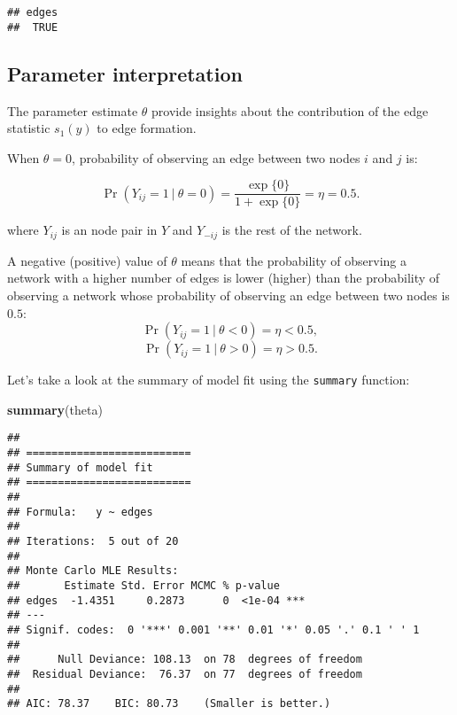 \documentclass[]{book}
\newenvironment{Shaded}{\begin{snugshade}}{\end{snugshade}}
\newcommand{\KeywordTok}[1]{\textcolor[rgb]{0.13,0.29,0.53}{\textbf{{#1}}}}
\newcommand{\NormalTok}[1]{{#1}}
\begin{document}
\begin{verbatim}
## edges 
##  TRUE
\end{verbatim}

\subsection{Parameter interpretation}\label{parameter-interpretation}

The parameter estimate \(\theta\) provide insights about the
contribution of the edge statistic \(s_1(y)\) to edge formation.

When \(\theta = 0\), probability of observing an edge between two nodes
\(i\) and \(j\) is:

\begin{equation*}
\Pr(Y_{ij} = 1\ |\ \theta = 0) = \frac{\exp \{ 0 \} }{ 1 + \exp \{ 0 \} } = \eta = 0.5.
\end{equation*}

where \(Y_{ij}\) is an node pair in \(Y\) and \(Y_{-ij}\) is the rest of
the network.

A negative (positive) value of \(\theta\) means that the probability of
observing a network with a higher number of edges is lower (higher) than
the probability of observing a network whose probability of observing an
edge between two nodes is \(0.5\):
\[\Pr(Y_{ij} = 1\ |\ \theta < 0) = \eta < 0.5,\]
\[\Pr(Y_{ij} = 1\ |\ \theta > 0) = \eta > 0.5.\]

Let's take a look at the summary of model fit using the \texttt{summary}
function:

\begin{Shaded}
\begin{Highlighting}[]
\KeywordTok{summary}\NormalTok{(theta)}
\end{Highlighting}
\end{Shaded}

\begin{verbatim}
## 
## ==========================
## Summary of model fit
## ==========================
## 
## Formula:   y ~ edges
## 
## Iterations:  5 out of 20 
## 
## Monte Carlo MLE Results:
##       Estimate Std. Error MCMC % p-value    
## edges  -1.4351     0.2873      0  <1e-04 ***
## ---
## Signif. codes:  0 '***' 0.001 '**' 0.01 '*' 0.05 '.' 0.1 ' ' 1
## 
##      Null Deviance: 108.13  on 78  degrees of freedom
##  Residual Deviance:  76.37  on 77  degrees of freedom
##  
## AIC: 78.37    BIC: 80.73    (Smaller is better.)
\end{verbatim}
\end{document}

